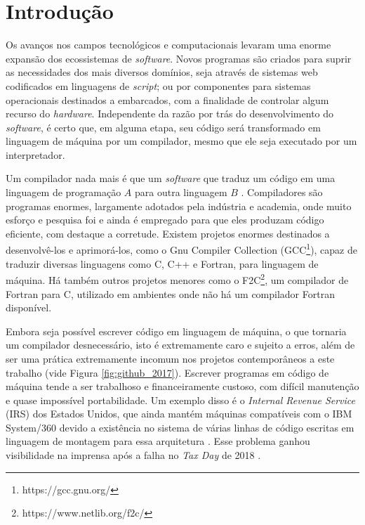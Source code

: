 \chapter{Introdução}
\label{cap:introducao}

Os avanços nos campos tecnológicos e computacionais levaram uma enorme expansão
dos ecossistemas de \textit{software}. Novos programas são criados para
suprir as necessidades dos mais diversos domínios, seja através de sistemas web
codificados em linguagens de \textit{script}; ou por componentes para
sistemas operacionais destinados a embarcados, com a finalidade de controlar algum
recurso do \textit{hardware}. Independente da razão por trás do desenvolvimento
do \textit{software}, é certo que, em alguma etapa, seu código será transformado em linguagem
de máquina por um compilador, mesmo que ele seja executado por um
interpretador.

Um compilador nada mais é que um \textit{software} que traduz um código em uma linguagem
de programação $A$ para outra linguagem $B$ \citep{dragonbook}.  Compiladores
são programas enormes, largamente adotados pela indústria e academia, onde muito
esforço e pesquisa foi e ainda é empregado para que eles produzam código
eficiente, com destaque a corretude. Existem projetos enormes destinados a desenvolvê-los e
aprimorá-los, como o Gnu Compiler Collection
(GCC\footnote{https://gcc.gnu.org/}), capaz de traduzir diversas linguagens
como C, C++ e Fortran, para linguagem de máquina. Há também outros projetos
menores como o F2C\footnote{https://www.netlib.org/f2c/}, um compilador de
Fortran para C, utilizado em ambientes onde não há um compilador Fortran
disponível.

Embora seja possível escrever código em linguagem de máquina, o que
tornaria um compilador desnecessário, isto é extremamente caro e
sujeito a erros, além de ser uma prática extremamente
incomum nos projetos contemporâneos a este trabalho \citep{githuboctoverse} (vide
Figura \ref{fig:github_2017}). Escrever programas em código de máquina tende a
ser trabalhoso e financeiramente custoso, com difícil manutenção e quase impossível portabilidade.
Um exemplo disso é o \textit{Internal Revenue Service} (IRS) dos Estados Unidos,
que ainda mantém máquinas compatíveis com o IBM System/360 devido a existência no sistema
de várias linhas de código escritas em linguagem de montagem para essa
arquitetura \citep{gao}. Esse problema ganhou visibilidade na imprensa após a falha no
\textit{Tax Day} de 2018 \citep{tax_failure}.


